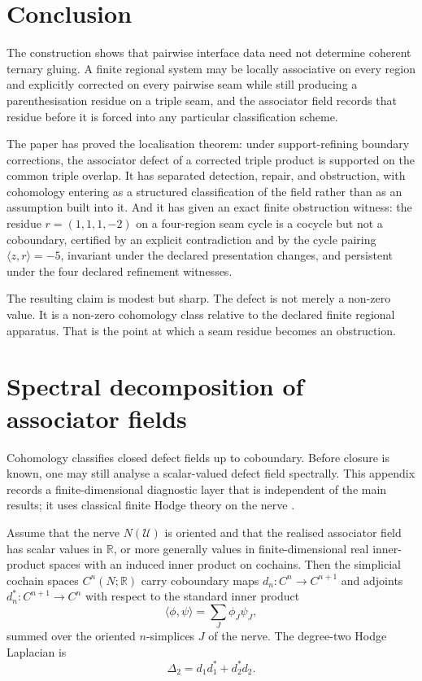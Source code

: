 \documentclass[11pt]{article}
\newcommand{\R}{\mathbb{R}}
\begin{document}
\section{Conclusion}

The construction shows that pairwise interface data need not determine coherent ternary gluing. A finite regional system may be locally associative on every region and explicitly corrected on every pairwise seam while still producing a parenthesisation residue on a triple seam, and the associator field records that residue before it is forced into any particular classification scheme.

The paper has proved the localisation theorem: under support-refining boundary corrections, the associator defect of a corrected triple product is supported on the common triple overlap. It has separated detection, repair, and obstruction, with cohomology entering as a structured classification of the field rather than as an assumption built into it. And it has given an exact finite obstruction witness: the residue \(r=(1,1,1,-2)\) on a four-region seam cycle is a cocycle but not a coboundary, certified by an explicit contradiction and by the cycle pairing \(\langle z,r\rangle=-5\), invariant under the declared presentation changes, and persistent under the four declared refinement witnesses.

The resulting claim is modest but sharp. The defect is not merely a non-zero value. It is a non-zero cohomology class relative to the declared finite regional apparatus. That is the point at which a seam residue becomes an obstruction.

\appendix

\section{Spectral decomposition of associator fields}
\label{app:spectral}

Cohomology classifies closed defect fields up to coboundary. Before closure is known, one may still analyse a scalar-valued defect field spectrally. This appendix records a finite-dimensional diagnostic layer that is independent of the main results; it uses classical finite Hodge theory on the nerve \cite{Eckmann1944}.

Assume that the nerve \(N(\mathcal U)\) is oriented and that the realised associator field has scalar values in \(\R\), or more generally values in finite-dimensional real inner-product spaces with an induced inner product on cochains. Then the simplicial cochain spaces \(C^n(N;\R)\) carry coboundary maps \(d_n:C^n\to C^{n+1}\) and adjoints \(d_n^*:C^{n+1}\to C^n\) with respect to the standard inner product
\[
\langle \phi,\psi\rangle=\sum_J \phi_J\psi_J,
\]
summed over the oriented \(n\)-simplices \(J\) of the nerve. The degree-two Hodge Laplacian is
\[
\Delta_2=d_1d_1^*+d_2^*d_2.
\]
\end{document}
